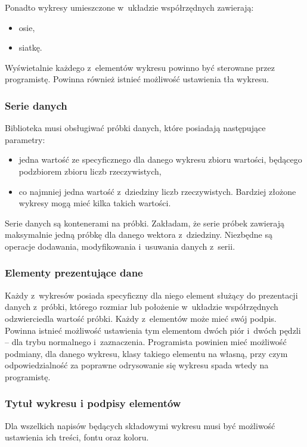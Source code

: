 Ponadto wykresy umieszczone w~układzie współrzędnych zawierają:
\begin{itemize}
\item{osie,} %
\item{siatkę.}
\end{itemize}

Wyświetalnie każdego z~elementów wykresu powinno być sterowane przez programistę. Powinna również istnieć możliwość ustawienia tła wykresu.

\subsubsection{Serie danych}
Biblioteka musi obsługiwać próbki danych, które posiadają następujące parametry:
\begin{itemize}
\item{jedna wartość ze specyficznego dla danego wykresu zbioru wartości, będącego podzbiorem zbioru liczb rzeczywistych,}
\item{co najmniej jedna wartość z~dziedziny liczb rzeczywistych. Bardziej złożone wykresy mogą mieć kilka takich wartości.}
\end{itemize}

Serie danych są kontenerami na próbki. Zakładam, że serie próbek zawierają maksymalnie jedną próbkę dla danego wektora z~dziedziny. Niezbędne są operacje dodawania, modyfikowania i~usuwania danych z~serii.
 
\subsubsection{Elementy prezentujące dane}
Każdy z~wykresów posiada specyficzny dla niego element służący do prezentacji danych z~próbki, którego rozmiar lub położenie w~układzie współrzędnych odzwierciedla wartość próbki. Każdy z~elementów może mieć swój podpis. Powinna istnieć możliwość ustawienia tym elementom dwóch piór i~dwóch pędzli -- dla trybu normalnego i~zaznaczenia. Programista powinien mieć możliwość podmiany, dla danego wykresu, klasy takiego elementu na własną, przy czym odpowiedzialność za poprawne odrysowanie się wykresu spada wtedy na programistę.

\subsubsection{Tytuł wykresu i podpisy elementów}
Dla wszelkich napisów będących składowymi wykresu musi być możliwość ustawienia ich treści, fontu oraz koloru.

